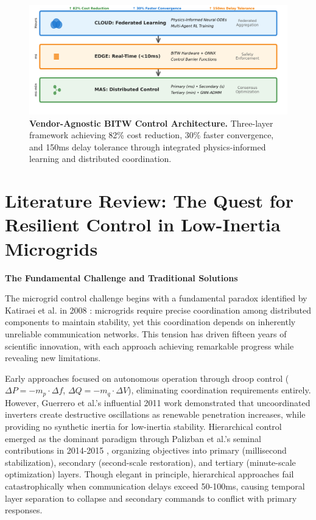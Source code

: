 \documentclass[12pt]{article}
\begin{document}
\begin{figure}[H]
\centering
\includegraphics[width=\textwidth]{figure3_system_architecture.pdf}
\vspace{-0.6cm}
\caption{\textbf{Vendor-Agnostic BITW Control Architecture.} Three-layer framework achieving 82\% cost reduction, 30\% faster convergence, and 150ms delay tolerance through integrated physics-informed learning and distributed coordination.}
\label{fig:architecture}
\end{figure}

\section{Literature Review: The Quest for Resilient Control in Low-Inertia Microgrids}

\textbf{The Fundamental Challenge and Traditional Solutions}

The microgrid control challenge begins with a fundamental paradox identified by Katiraei et al. in 2008 \cite{katiraei2008}: microgrids require precise coordination among distributed components to maintain stability, yet this coordination depends on inherently unreliable communication networks. This tension has driven fifteen years of scientific innovation, with each approach achieving remarkable progress while revealing new limitations.

Early approaches focused on autonomous operation through droop control ($\Delta P = -m_p \cdot \Delta f$, $\Delta Q = -m_q \cdot \Delta V$), eliminating coordination requirements entirely. However, Guerrero et al.'s influential 2011 work \cite{guerrero2011} demonstrated that uncoordinated inverters create destructive oscillations as renewable penetration increases, while providing no synthetic inertia for low-inertia stability. Hierarchical control emerged as the dominant paradigm through Palizban et al.'s seminal contributions in 2014-2015 \cite{palizban2014,palizban2015}, organizing objectives into primary (millisecond stabilization), secondary (second-scale restoration), and tertiary (minute-scale optimization) layers. Though elegant in principle, hierarchical approaches fail catastrophically when communication delays exceed 50-100ms, causing temporal layer separation to collapse and secondary commands to conflict with primary responses.
\end{document}
